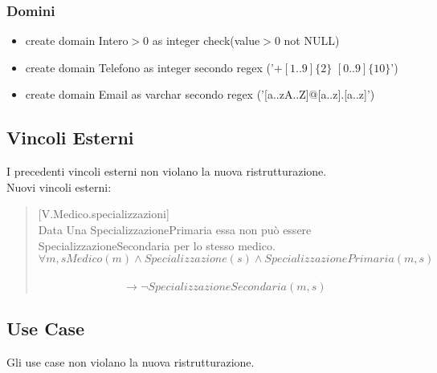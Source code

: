 \documentclass[12pt, letterpaper]{article}
\begin{document}
\subsubsection{Domini}
\begin{itemize}
    \item create domain Intero$>$0 as integer check(value$>$0 not NULL)
    \item create domain Telefono as integer secondo regex ('$+[1..9]\{2\}$ $[0..9]\{10\}$')
    \item create domain Email as varchar secondo regex ('[a..zA..Z]@[a..z].[a..z]') 
\end{itemize}
\subsection{Vincoli Esterni}
I precedenti vincoli esterni non violano la nuova ristrutturazione.\\
Nuovi vincoli esterni:\\
\begin{quote}
    [V.Medico.specializzazioni]\\
        Data Una SpecializzazionePrimaria essa non può essere SpecializzazioneSecondaria per lo stesso medico.\\
        $$\forall m, s Medico(m) \land Specializzazione(s) \land SpecializzazionePrimaria(m,s)$$\\ $$\rightarrow \lnot SpecializzazioneSecondaria(m,s)$$
\end{quote}
\subsection{Use Case}
Gli use case non violano la nuova ristrutturazione.
\newpage
\end{document}
